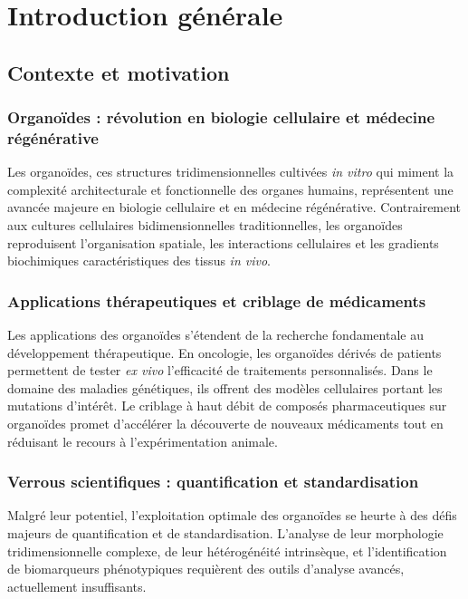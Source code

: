 
\chapter{Introduction générale}

\section{Contexte et motivation}

\subsection{Organoïdes : révolution en biologie cellulaire et médecine régénérative}

Les organoïdes, ces structures tridimensionnelles cultivées \textit{in vitro} qui miment la complexité architecturale et fonctionnelle des organes humains, représentent une avancée majeure en biologie cellulaire et en médecine régénérative. Contrairement aux cultures cellulaires bidimensionnelles traditionnelles, les organoïdes reproduisent l'organisation spatiale, les interactions cellulaires et les gradients biochimiques caractéristiques des tissus \textit{in vivo}.

\subsection{Applications thérapeutiques et criblage de médicaments}

Les applications des organoïdes s'étendent de la recherche fondamentale au développement thérapeutique. En oncologie, les organoïdes dérivés de patients permettent de tester \textit{ex vivo} l'efficacité de traitements personnalisés. Dans le domaine des maladies génétiques, ils offrent des modèles cellulaires portant les mutations d'intérêt. Le criblage à haut débit de composés pharmaceutiques sur organoïdes promet d'accélérer la découverte de nouveaux médicaments tout en réduisant le recours à l'expérimentation animale.

\subsection{Verrous scientifiques : quantification et standardisation}

Malgré leur potentiel, l'exploitation optimale des organoïdes se heurte à des défis majeurs de quantification et de standardisation. L'analyse de leur morphologie tridimensionnelle complexe, de leur hétérogénéité intrinsèque, et l'identification de biomarqueurs phénotypiques requièrent des outils d'analyse avancés, actuellement insuffisants.

